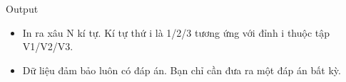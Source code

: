 Output
\begin{itemize}
	\item     In ra xâu N kí tự. Kí tự thứ i là 1/2/3 tương ứng với đỉnh i thuộc tập V1/V2/V3.   
	\item     Dữ liệu đảm bảo luôn có đáp án. Bạn chỉ cần đưa ra một đáp án bất kỳ.   
\end{itemize}